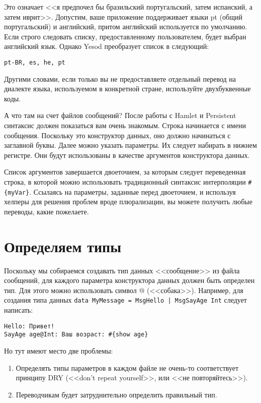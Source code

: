 Это означает <<я предпочел бы бразильский португальский, затем испанский, а затем иврит>>. Допустим, ваше приложение поддерживает языки pt (общий португальский) и английский, притом английский используется по умолчанию. Если строго следовать списку, предоставленному пользователем, будет выбран английский язык. Однако Yesod преобразует список в следующий:

\begin{lstlisting}
pt-BR, es, he, pt
\end{lstlisting}

Другими словами, если только вы не предоставляете отдельный перевод на диалекте языка, используемом в конкретной стране, используйте двухбуквенные коды. %

А что там на счет файлов сообщений? После работы с Hamlet и Persistent синтаксис должен показаться вам очень знакомым. Строка начинается с имени сообщения. Поскольку это конструктор данных, оно должно начинаться с заглавной буквы. Далее можно указать параметры. Их следует набирать в нижнем регистре. Они будут использованы в качестве аргументов конструктора данных.

Список аргументов завершается двоеточием, за которым следует переведенная строка, в которой можно использовать традиционный синтаксис интерполяции \lstinline'#{myVar}'. Ссылаясь на параметры, заданные перед двоеточием, и используя хелперы для решения проблем вроде плюрализации, вы можете получить любые переводы, какие пожелаете.

\section{Определяем типы} %

Поскольку мы собираемся создавать тип данных <<сообщение>> из файла сообщений, для каждого параметра конструктора данных должен быть определен тип. Для этого можно использовать символ @ (<<собака>>). Например, для создания типа данных \lstinline'data MyMessage = MsgHello | MsgSayAge Int' следует написать:

\begin{lstlisting}
Hello: Привет!
SayAge age@Int: Ваш возраст: #{show age}
\end{lstlisting}

Но тут имеют место две проблемы:

\begin{enumerate}
  \item Определять типы параметров в каждом файле не очень-то соответствует принципу DRY (<<don't repeat yourself>>, или <<не повторяйтесь>>).
  \item Переводчикам будет затруднительно определить правильный тип.
\end{enumerate}

